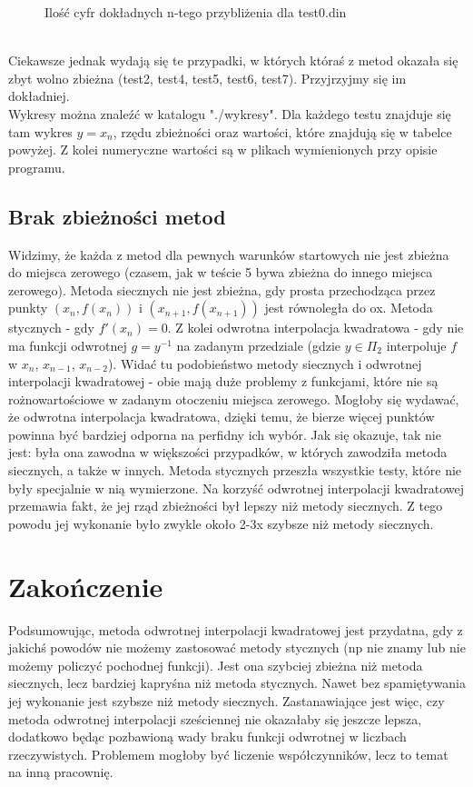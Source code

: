 \documentclass[11pt,wide]{mwart}
\begin{document}
\begin{figure}[ht]
\begin{minipage}[b]{0.45\linewidth}
    \caption{Ilość cyfr dokładnych n-tego przybliżenia dla test0.din}
    \label{fig:test0}
  \end{minipage}
\end{figure}
\\ \indent Ciekawsze jednak wydają się te przypadki, w których któraś z metod okazała się zbyt wolno zbieżna (test2, test4, test5, test6, test7). Przyjrzyjmy się im dokładniej.
{\small{\\Wykresy można znaleźć w katalogu "./wykresy". Dla każdego testu znajduje się tam wykres $y = x_{n}$, rzędu zbieżności oraz wartości, które znajdują się w tabelce powyżej. Z kolei numeryczne wartości są w plikach wymienionych przy opisie programu. }} 
\subsection{Brak zbieżności metod}
Widzimy, że każda z metod dla pewnych warunków startowych nie jest zbieżna do miejsca zerowego (czasem, jak w teście 5 bywa zbieżna do innego miejsca zerowego). Metoda siecznych nie jest zbieżna, gdy prosta przechodząca przez punkty $(x_{n}, f(x_{n}))$ i $(x_{n+1}, f(x_{n+1}))$ jest równoległa do ox. Metoda stycznych - gdy $f'(x_{n}) = 0$. Z kolei odwrotna interpolacja kwadratowa - gdy nie ma funkcji odwrotnej $g = y^{-1}$ na zadanym przedziale (gdzie $y \in \Pi_2$ interpoluje $f$ w $x_{n}$, $x_{n-1}$, $x_{n-2}$).
Widać tu podobieństwo metody siecznych i odwrotnej interpolacji kwadratowej - obie mają duże problemy z funkcjami, które nie są rożnowartościowe w zadanym otoczeniu miejsca zerowego. Mogłoby się wydawać, że odwrotna interpolacja kwadratowa, dzięki temu, że bierze więcej punktów powinna być bardziej odporna na perfidny ich wybór. Jak się okazuje, tak nie jest: była ona zawodna w większości przypadków, w których zawodziła metoda siecznych, a także w innych. Metoda stycznych przeszła wszystkie testy, które nie były specjalnie w nią wymierzone. Na korzyść odwrotnej interpolacji kwadratowej przemawia fakt, że jej rząd zbieżności był lepszy niż metody siecznych. Z tego powodu jej wykonanie było zwykle około 2-3x szybsze niż metody siecznych.
\section{Zakończenie}
Podsumowując, metoda odwrotnej interpolacji kwadratowej jest przydatna, gdy z jakichś powodów nie możemy zastosować metody stycznych (np nie znamy lub nie możemy policzyć pochodnej funkcji). Jest ona szybciej zbieżna niż metoda siecznych, lecz bardziej kapryśna niż metoda stycznych. Nawet bez spamiętywania jej wykonanie jest szybsze niż metody siecznych. Zastanawiające jest więc, czy metoda odwrotnej interpolacji sześciennej nie okazałaby się jeszcze lepsza, dodatkowo będąc pozbawioną wady braku funkcji odwrotnej w liczbach rzeczywistych. Problemem mogłoby być liczenie współczynników, lecz to temat na inną pracownię.
\end{document}
